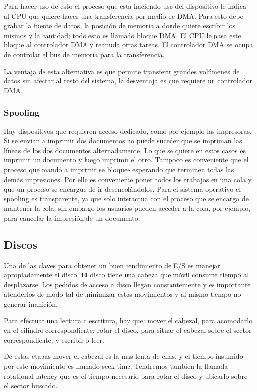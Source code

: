 \documentclass{article}
\begin{document}
Para hacer uso de esto el proceso que esta haciendo uso del dispositivo le indica al CPU que quiere hacer una transferencia por medio de DMA. Para esto debe grabar la fuente de datos, la posición de memoria a donde quiere escribir los mismos y la cantidad; todo esto es llamado bloque DMA. El CPU le pasa este bloque al controlador DMA y reanuda otras tareas. El controlador DMA se ocupa de controlar el bus de memoria para la transferencia.

La ventaja de esta alternativa es que permite transferir grandes volúmenes de datos sin afectar al resto del sistema, la desventaja es que requiere un controlador DMA.

\subsubsection{Spooling}

Hay dispositivos que requieren acceso dedicado, como por ejemplo las impresoras. Si se envian a imprimir dos documentos no puede suceder que se impriman las l\'ineas de los dos documentos alternadamente. Lo que se quiere en estos casos es imprimir un documento y luego imprimir el otro. Tampoco es conveniente que el proceso que mand\'o a imprimir se bloquee esperando que terminen todas las dem\'as impresiones. Por ello es conveniente poner todos los trabajos en una cola y que un proceso se encargue de ir desencol\'andolos. Para el sistema operativo el spooling es transparente, ya que solo interactua con el proceso que se encarga de mantener la cola, sin embargo los usuarios pueden acceder a la cola, por ejemplo, para cancelar la impresi\'on de un documento.

\subsection{Discos}

Una de las claves para obtener un buen rendimiento de E/S es manejar apropiadamente el disco. El disco tiene una cabeza que móvil consume tiempo al desplazarse. Los pedidos de acceso a disco llegan constantemente y es importante atenderlos de modo tal de minimizar estos movimientos y al mismo tiempo no generar inanici\'on.

Para efectuar una lectura o escritura, hay que: mover el cabezal, para acomodarlo en el cilindro correspondiente; rotar el disco, para situar el cabezal sobre el sector correspondiente; y escribir o leer.

De estas etapas mover el cabezal es la mas lenta de ellas, y el tiempo insumido por este movimiento es llamado seek time. Tendremos tambien la llamada rotational latency que es el tiempo necesario para rotar el disco y ubicarlo sobre el sector buscado.
\end{document}
